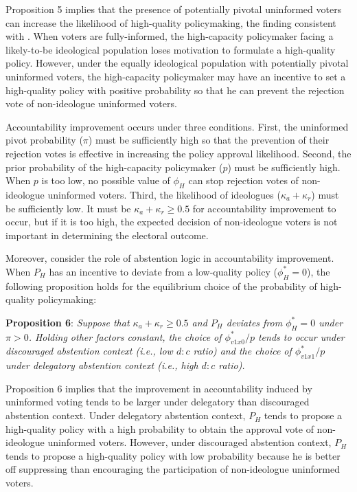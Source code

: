 \documentclass[letterpaper, 12pt]{article}
\begin{document}
    \par Proposition 5 implies that the presence of potentially pivotal uninformed voters can increase the likelihood of high-quality policymaking, the finding consistent with \cite{Ashworth2014isvo}. When voters are fully-informed, the high-capacity policymaker facing a likely-to-be ideological population loses motivation to formulate a high-quality policy. However, under the equally ideological population with potentially pivotal uninformed voters, the high-capacity policymaker may have an incentive to set a high-quality policy with positive probability so that he can prevent the rejection vote of non-ideologue uninformed voters.
    
    \par Accountability improvement occurs under three conditions. First, the uninformed pivot probability ($\pi$) must be sufficiently high so that the prevention of their rejection votes is effective in increasing the policy approval likelihood. Second, the prior probability of the high-capacity policymaker ($p$) must be sufficiently high. When $p$ is too low, no possible value of $\phi_H$ can stop rejection votes of non-ideologue uninformed voters. Third, the likelihood of ideologues ($\kappa_{a}+\kappa_{r}$) must be sufficiently low. It must be $\kappa_{a}+\kappa_{r} \geq 0.5$ for accountability improvement to occur, but if it is too high, the expected decision of non-ideologue voters is not important in determining the electoral outcome.
    
    \par Moreover, consider the role of abstention logic in accountability improvement. When $P_H$ has an incentive to deviate from a low-quality policy ($\phi^*_H=0$), the following proposition holds for the equilibrium choice of the probability of high-quality policymaking:
    
    \noindent \textbf{Proposition 6}: \textit{Suppose that $\kappa_{a}+\kappa_{r} \geq 0.5$ and $P_H$ deviates from $\phi^*_H=0$ under $\pi>0$. Holding other factors constant, the choice of $\phi^*_{v1x0}/p$ tends to occur under discouraged abstention context (i.e., low $d:c$ ratio) and the choice of $\phi^*_{v1x1}/p$ under delegatory abstention context (i.e., high $d:c$ ratio).}
    
    \noindent Proposition 6 implies that the improvement in accountability induced by uninformed voting tends to be larger under delegatory than discouraged abstention context. Under delegatory abstention context, $P_H$ tends to propose a high-quality policy with a high probability to obtain the approval vote of non-ideologue uninformed voters. However, under discouraged abstention context, $P_H$ tends to propose a high-quality policy with low probability because he is better off suppressing than encouraging the participation of non-ideologue uninformed voters.
    
\end{document}
